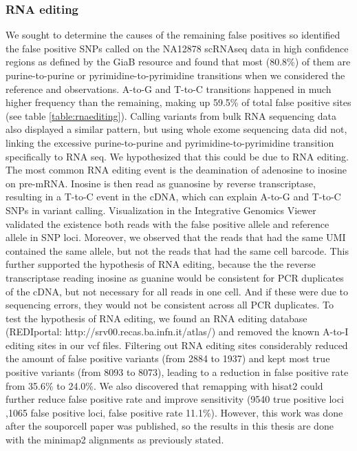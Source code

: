 \subsubsection{RNA editing}
\par{
We sought to determine the causes of the remaining false positives so identified the false positive SNPs called on the NA12878 scRNAseq data in high confidence regions as defined by the GiaB resource and found that most (80.8\%) of them are purine-to-purine or pyrimidine-to-pyrimidine transitions when we considered the reference and observations. A-to-G and T-to-C transitions happened in much higher frequency than the remaining, making up 59.5\% of
total false positive sites (see table \ref{table:rnaediting}). Calling variants from bulk RNA sequencing data also
displayed a similar pattern, but using whole exome sequencing data did not, linking the
excessive purine-to-purine and pyrimidine-to-pyrimidine transition specifically to RNA seq. We hypothesized that this could be due to RNA editing. The most common RNA editing event is the
deamination of adenosine to inosine on pre-mRNA\cite{atoi}. Inosine is then read as guanosine by
reverse transcriptase, resulting in a T-to-C event in the cDNA, which can explain A-to-G and T-to-C SNPs in variant calling. Visualization in the Integrative Genomics Viewer\cite{IGV} validated the
existence both reads with the false positive allele and reference allele in SNP loci. Moreover, we observed
that the reads that had the same UMI contained the same allele, but not the reads that had
the same cell barcode. This further supported the hypothesis of RNA editing, because the the reverse transcriptase reading inosine as guanine would be consistent for PCR duplicates of the cDNA, but
not necessary for all reads in one cell. And if these were due to sequencing errors, they would not be consistent across all PCR duplicates. To test the hypothesis of RNA editing, we found an RNA editing database (REDIportal\cite{rnaediting}: http://srv00.recas.ba.infn.it/atlas/) and removed the known A-to-I editing sites in our vcf files.
Filtering out RNA editing sites considerably reduced the amount of false positive variants (from
2884 to 1937) and kept most true positive variants (from 8093 to 8073), leading to a reduction
in false positive rate from 35.6\% to 24.0\%. We also discovered that remapping with hisat2
could further reduce false positive rate and improve sensitivity (9540 true positive loci ,1065
false positive loci, false positive rate 11.1\%). However, this work was done after the souporcell paper was published, so the results in this thesis are done with the minimap2 alignments as previously stated.
}

